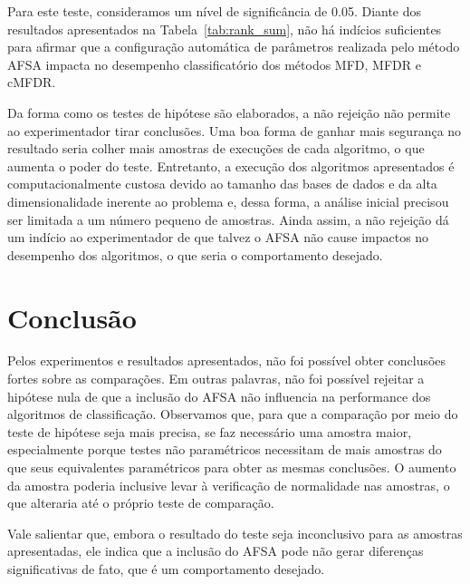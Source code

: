 \documentclass[conference]{IEEEtran}
\begin{document}
Para este teste, consideramos um nível de significância de 0.05.
Diante dos resultados apresentados na Tabela~\ref{tab:rank_sum}, não há indícios suficientes para afirmar que a configuração automática de parâmetros realizada pelo método AFSA impacta no desempenho classificatório dos métodos MFD, MFDR e cMFDR.

Da forma como os testes de hipótese são elaborados, a não rejeição não permite ao experimentador tirar conclusões. 
Uma boa forma de ganhar mais segurança no resultado seria colher mais amostras de execuções de cada algoritmo, o que aumenta o poder do teste. Entretanto, a execução dos algoritmos apresentados é computacionalmente custosa devido ao tamanho das bases de dados e da alta dimensionalidade inerente ao problema e, dessa forma, a análise inicial precisou ser limitada a um número pequeno de amostras.
Ainda assim, a não rejeição dá um indício ao experimentador de que talvez o AFSA não cause impactos no desempenho dos algoritmos, o que seria o comportamento desejado.


\section{Conclusão}
\label{sec:conclusao}
Pelos experimentos e resultados apresentados, não foi possível obter conclusões fortes sobre as comparações. Em outras palavras, não foi possível rejeitar a hipótese nula de que a inclusão do AFSA não influencia na performance dos algoritmos de classificação.
Observamos que, para que a comparação por meio do teste de hipótese seja mais precisa, se faz necessário uma amostra maior, especialmente porque testes não paramétricos necessitam de mais amostras do que seus equivalentes paramétricos para obter as mesmas conclusões.
O aumento da amostra poderia inclusive levar à verificação de normalidade nas amostras, o que alteraria até o próprio teste de comparação.

Vale salientar que, embora o resultado do teste seja inconclusivo para as amostras apresentadas, ele indica que a inclusão do AFSA pode não gerar diferenças significativas de fato, que é um comportamento desejado.



% 

\end{document}

